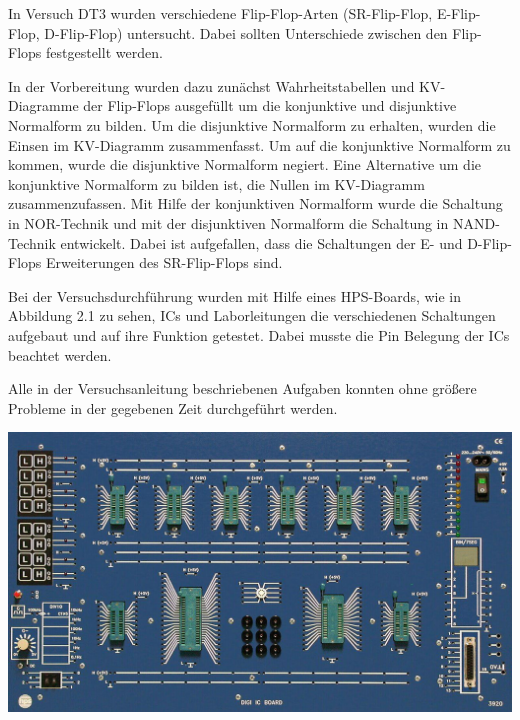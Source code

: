 In Versuch DT3 wurden verschiedene Flip-Flop-Arten (SR-Flip-Flop, E-Flip-Flop, D-Flip-Flop) untersucht. Dabei sollten Unterschiede zwischen den Flip-Flops festgestellt werden. \par
In der Vorbereitung wurden dazu zunächst Wahrheitstabellen und KV-Diagramme der Flip-Flops ausgefüllt um die konjunktive und disjunktive Normalform zu bilden. Um die disjunktive Normalform zu erhalten, wurden die Einsen im KV-Diagramm zusammenfasst. Um auf die konjunktive Normalform zu kommen, wurde die disjunktive Normalform negiert. Eine Alternative um die konjunktive Normalform zu bilden ist, die Nullen im KV-Diagramm zusammenzufassen. Mit Hilfe der konjunktiven Normalform wurde die Schaltung in NOR-Technik und mit der disjunktiven Normalform die Schaltung in NAND-Technik entwickelt. Dabei ist aufgefallen, dass die Schaltungen der E- und D-Flip-Flops Erweiterungen des SR-Flip-Flops sind.  \par
Bei der Versuchsdurchführung wurden mit Hilfe eines HPS-Boards, wie in Abbildung 2.1 zu sehen, ICs und Laborleitungen die verschiedenen Schaltungen aufgebaut und auf ihre Funktion getestet. Dabei musste die Pin Belegung der ICs beachtet werden. \par
Alle in der Versuchsanleitung beschriebenen Aufgaben konnten ohne größere Probleme in der gegebenen Zeit durchgeführt werden.\\
\vspace{10mm}
\begin{center}
\includegraphics[width=0.75\columnwidth]{DT3Graphics/HPSBoard.jpg}
\end{center}
